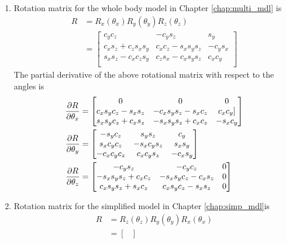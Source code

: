 \begin{enumerate}
\item Rotation matrix for the whole body model in Chapter \ref{chap:multi_mdl} is 
\begin{equation}
	\label{eq:rot_full}
	\begin{split}
	R &= R_x(\theta_x) R_y(\theta_y) R_z(\theta_z) \\
	&= 
	\begin{bmatrix}
		c_yc_z &-c_ys_z &s_y \\
		c_xs_z+c_zs_xs_y &c_xc_z-s_xs_ys_z &-c_ys_x \\
  		s_xs_z-c_xc_zs_y &c_zs_x-c_xs_ys_z & c_xc_y \\
	\end{bmatrix}
	\end{split}
\end{equation}
The partial derivative of the above rotational matrix with respect to the angles is
\begin{equation}
	\begin{split}
	\frac{\partial {R}}{\partial {\theta_x}} &=
	\begin{bmatrix} 
		0 &0 &0 \\
        c_xs_yc_z-s_xs_z &-c_xs_ys_z-s_xc_z &c_xc_y]\\
        s_xs_yc_z+c_xs_z &-s_xs_ys_z+c_xc_z &-s_xc_y
	\end{bmatrix}\\
	\frac{\partial {R}}{\partial {\theta_y}}&=
	\begin{bmatrix}
    -s_yc_z &s_ys_z &c_y \\
     s_xc_yc_z &-s_xc_ys_z & s_xs_y \\
    -c_xc_yc_z & c_xc_ys_z &-c_xs_y
	\end{bmatrix}\\
	\frac{\partial {R}}{\partial {\theta_z}}&=
	\begin{bmatrix}
    -c_ys_z &-c_yc_z &0 \\
    -s_xs_ys_z+c_xc_z &-s_xs_yc_z-c_xs_z &0 \\
     c_xs_ys_z+s_xc_z &c_xs_yc_z-s_xs_z &0
	\end{bmatrix}
	\end{split}
\end{equation}
\item Rotation matrix for the simplified model in Chapter \ref{chap:simp_mdl}is 
\begin{equation}
	\label{eq:rot_simp}
	\begin{split}
		R &= R_z(\theta_z) R_y(\theta_y) R_x(\theta_x)\\ &=
		\begin{bmatrix}

\end{bmatrix}
\end{split}
\end{equation}
\end{enumerate}
